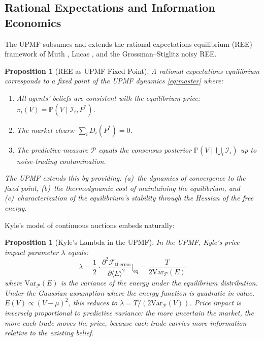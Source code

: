 \documentclass[12pt,a4paper]{article}
\newtheorem{proposition}[theorem]{Proposition}
\theoremstyle{definition}
\newcommand{\Prob}{\mathbb{P}}
\newcommand{\I}{\mathcal{I}}
\newcommand{\PP}{\mathcal{P}}
\newcommand{\Var}{\mathrm{Var}}
\begin{document}
\subsection{Rational Expectations and Information Economics}\label{sec:lit_rational}

The UPMF subsumes and extends the rational expectations equilibrium (REE) framework of Muth \citep{muth1961}, Lucas \citep{lucas1972}, and the Grossman--Stiglitz \citep{grossman1980} noisy REE.

\begin{proposition}[REE as UPMF Fixed Point]\label{prop:ree}
A rational expectations equilibrium corresponds to a fixed point of the UPMF dynamics \eqref{eq:master} where:
\begin{enumerate}[label=(\roman*)]
    \item All agents' beliefs are consistent with the equilibrium price: $\pi_i(V) = \Prob(V \mid \I_i, P^*)$.
    \item The market clears: $\sum_i D_i(P^*) = 0$.
    \item The predictive measure $\PP$ equals the consensus posterior $\Prob(V \mid \bigcup_i \I_i)$ up to noise-trading contamination.
\end{enumerate}
The UPMF extends this by providing: (a)~the dynamics of convergence to the fixed point, (b)~the thermodynamic cost of maintaining the equilibrium, and (c)~characterization of the equilibrium's stability through the Hessian of the free energy.
\end{proposition}

Kyle's \citeyearpar{kyle1985} model of continuous auctions embeds naturally:

\begin{proposition}[Kyle's Lambda in the UPMF]\label{prop:kyle_upmf}
In the UPMF, Kyle's price impact parameter $\lambda$ equals:
\begin{equation}
    \lambda = \frac{1}{2} \cdot \frac{\partial^2 \mathcal{F}_{\text{thermo}}}{\partial \langle E \rangle^2} \bigg|_{\text{eq}} = \frac{T}{2\Var_{\PP}(E)}
\end{equation}
where $\Var_{\PP}(E)$ is the variance of the energy under the equilibrium distribution. Under the Gaussian assumption where the energy function is quadratic in value, $E(V) \propto (V - \mu)^2$, this reduces to $\lambda = T / (2\Var_{\PP}(V))$. Price impact is inversely proportional to predictive variance: the more uncertain the market, the more each trade moves the price, because each trade carries more information relative to the existing belief.
\end{proposition}
\end{document}

